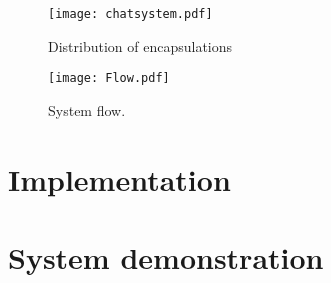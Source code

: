 \begin{figure}
\centering
\texttt{[image: chatsystem.pdf]}
\caption{Distribution of encapsulations}
\label{fig:encapdistr}
\end{figure}

\begin{figure}
\centering
\texttt{[image: Flow.pdf]}
\caption{System flow.}
\label{fig:flow}
\end{figure}
\section{Implementation}
\section{System demonstration}


